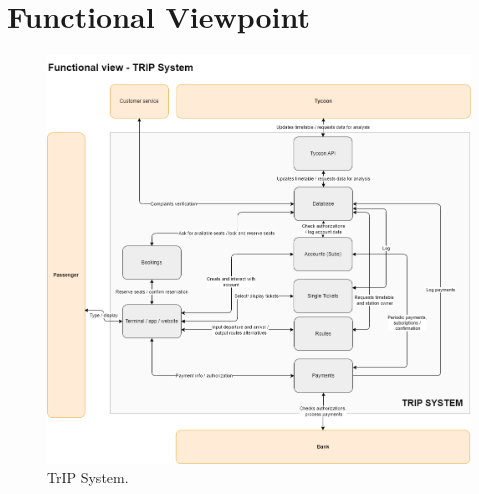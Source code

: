 \section{Functional Viewpoint}
\begin{figure}[H]
    \centering
    \includegraphics[width=\textwidth]{drawings/views_final_version/functional_view.png}
    \caption{TrIP System.}
    \label{fig:trip_system}
\end{figure}

